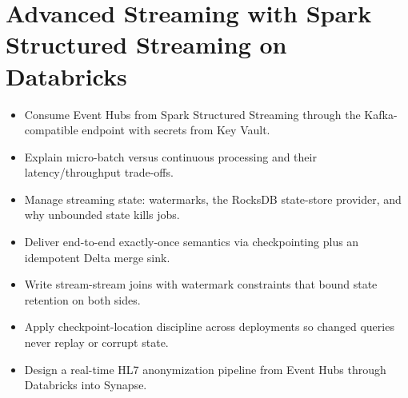 \chapter{Advanced Streaming with Spark Structured Streaming on Databricks}
%
\begin{objectives}
\begin{itemize}
    \item Consume Event Hubs from Spark Structured Streaming through the Kafka-compatible endpoint with secrets from Key Vault.
    \item Explain micro-batch versus continuous processing and their latency/throughput trade-offs.
    \item Manage streaming state: watermarks, the RocksDB state-store provider, and why unbounded state kills jobs.
    \item Deliver end-to-end exactly-once semantics via checkpointing plus an idempotent Delta merge sink.
    \item Write stream-stream joins with watermark constraints that bound state retention on both sides.
    \item Apply checkpoint-location discipline across deployments so changed queries never replay or corrupt state.
    \item Design a real-time HL7 anonymization pipeline from Event Hubs through Databricks into Synapse.
\end{itemize}
\end{objectives}

